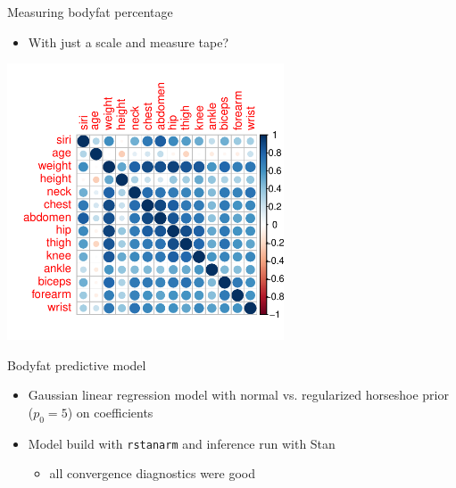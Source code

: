 \documentclass[english,t]{beamer}
\begin{document}
\begin{frame}
  
  {\Large\color{navyblue} Measuring bodyfat percentage}


  \vspace{-.5\baselineskip}
  \begin{itemize}
  \item With just a scale and measure tape?
  \end{itemize}
  
  \vspace{-.7\baselineskip}
  \includegraphics[width=8.2cm]{bodyfat_corr.pdf}

\end{frame}


\begin{frame}
  
  {\Large\color{navyblue} Bodyfat predictive model}

  \begin{itemize}
  \item<1-> Gaussian linear regression model with normal
    vs. regularized horseshoe prior ($p_0=5$) on coefficients
  \item<2-> Model build with {\tt rstanarm} and inference run with
    Stan
    \begin{itemize}
    \item all convergence diagnostics were good
    \end{itemize}
\end{itemize}
\end{frame}
\end{document}
